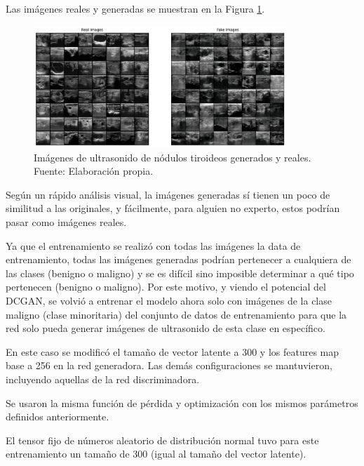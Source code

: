 Las imágenes reales y generadas se muestran en la Figura \ref{4:fig115}.

\begin{figure}[H]
	\begin{center}
		\includegraphics[width=0.85\textwidth]{4/figures/generated_real_1.png}
		\caption[Imágenes de ultrasonido de nódulos tiroideos generados y reales]{Imágenes de ultrasonido de nódulos tiroideos generados y reales. \\
		Fuente: Elaboración propia.}
		\label{4:fig115}
	\end{center}
\end{figure}

Según un rápido análisis visual, la imágenes generadas sí tienen un poco de similitud a las originales, y fácilmente, para alguien no experto, estos podrían pasar como imágenes reales.

Ya que el entrenamiento se realizó con todas las imágenes la data de entrenamiento, todas las imágenes generadas podrían pertenecer a cualquiera de las clases (benigno o maligno) y se es difícil sino imposible determinar a qué tipo pertenecen (benigno o maligno). Por este motivo, y viendo el potencial del DCGAN, se volvió a entrenar el modelo ahora solo con imágenes de la clase maligno (clase minoritaria) del conjunto de datos de entrenamiento para que la red solo pueda generar imágenes de ultrasonido de esta clase en específico.

En este caso se modificó el tamaño de vector latente a 300 y los features map base a 256 en la red generadora. Las demás configuraciones se mantuvieron, incluyendo aquellas de la red discriminadora.

Se usaron la misma función de pérdida y optimización con los mismos parámetros definidos anteriormente.

El tensor fijo de números aleatorio de distribución normal tuvo para este entrenamiento un tamaño de 300 (igual al tamaño del vector latente).

